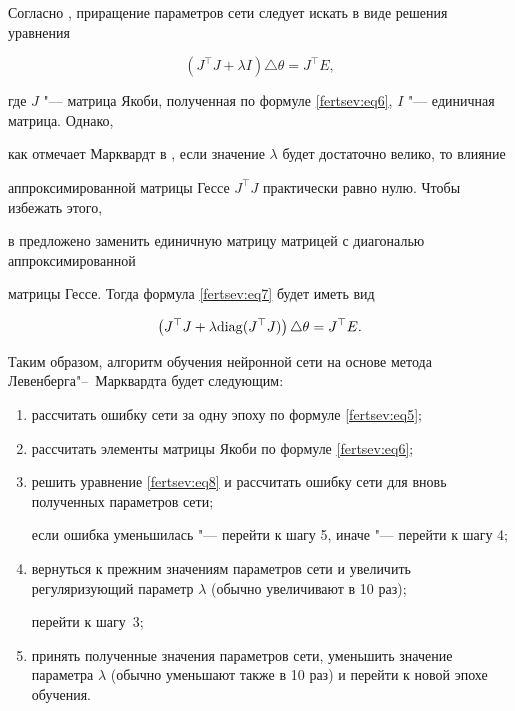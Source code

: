 Согласно \cite{afertsev:Hagan}, приращение параметров сети следует искать в виде решения уравнения

\begin{equation}

\label{fertsev:eq7}

(J^\top J+\lambda I)\triangle \theta =J^\top E,

\end{equation}

где $J$ "--- матрица Якоби, полученная по формуле \eqref{fertsev:eq6}, $I$ "--- единичная матрица. Однако,

как отмечает Марквардт в \cite{afertsev:Marquardt}, если значение $\lambda $ будет достаточно велико, то влияние

аппроксимированной матрицы Гессе $J^\top J$ практически равно нулю. Чтобы избежать этого,

в \cite{afertsev:Marquardt} предложено заменить единичную матрицу матрицей с диагональю аппроксимированной

матрицы Гессе. Тогда формула \eqref{fertsev:eq7} будет иметь вид

\begin{equation}

\label{fertsev:eq8}

\left(J^\top J  + \lambda {\rm diag} (J^\top J) \right)\triangle \theta  =J^\top E.

\end{equation}



Таким образом, алгоритм обучения нейронной сети на основе метода Левенберга"--~Марквардта будет следующим:



\begin{enumerate}

\item  рассчитать ошибку сети за одну эпоху по формуле \eqref{fertsev:eq5};



\item  рассчитать элементы матрицы Якоби по формуле \eqref{fertsev:eq6};



\item  решить уравнение \eqref{fertsev:eq8} и рассчитать ошибку сети для вновь полученных параметров сети;

если ошибка уменьшилась "--- перейти к шагу 5, иначе "--- перейти к шагу 4;



\item  вернуться к прежним значениям параметров сети и увеличить регуляризующий параметр $\lambda $ (обычно увеличивают в 10 раз);

перейти к шагу~3;



\item  принять полученные значения параметров сети, уменьшить значение параметра $\lambda $ (обычно уменьшают также в 10 раз) и перейти к новой эпохе обучения.

\end{enumerate}




